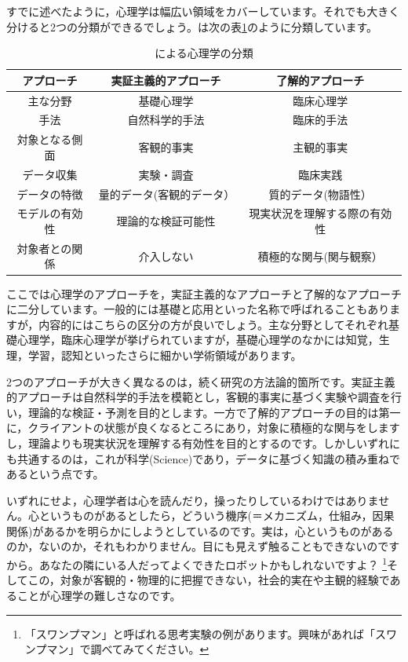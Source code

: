 \documentclass{ltjsbook}
\begin{document}
すでに述べたように，心理学は幅広い領域をカバーしています。それでも大きく分けると2つの分類ができるでしょう。\citet{Shimoyama2001}は次の表\ref{tbl01_01}のように分類しています。

\begin{table}[hb]
	\centering
	\caption{\citet{Shimoyama2001}による心理学の分類}
	\begin{tabular}{ccc}
		アプローチ   & 実証主義的アプローチ    & 了解的アプローチ       \\\hline
		主な分野    & 基礎心理学         & 臨床心理学          \\
		手法      & 自然科学的手法       & 臨床的手法          \\
		対象となる側面 & 客観的事実         & 主観的事実          \\
		データ収集   & 実験・調査         & 臨床実践           \\
		データの特徴  & 量的データ(客観的データ） & 質的データ(物語性）     \\
		モデルの有効性 & 理論的な検証可能性     & 現実状況を理解する際の有効性 \\
		対象者との関係 & 介入しない         & 積極的な関与(関与観察）   \\\hline
	\end{tabular}
	\label{tbl01_01}
\end{table}
ここでは心理学のアプローチを，実証主義的なアプローチと了解的なアプローチに二分しています。一般的には基礎と応用といった名称で呼ばれることもありますが，内容的にはこちらの区分の方が良いでしょう。主な分野としてそれぞれ基礎心理学，臨床心理学が挙げられていますが，基礎心理学のなかには知覚，生理，学習，認知といったさらに細かい学術領域があります。

2つのアプローチが大きく異なるのは，続く研究の方法論的箇所です。実証主義的アプローチは自然科学的手法を模範とし，客観的事実に基づく実験や調査を行い，理論的な検証・予測を目的とします。一方で了解的アプローチの目的は第一に，クライアントの状態が良くなるところにあり，対象に積極的な関与をしますし，理論よりも現実状況を理解する有効性を目的とするのです。しかしいずれにも共通するのは，これが科学(Science)であり，データに基づく知識の積み重ねであるという点です。

いずれにせよ，心理学者は心を読んだり，操ったりしているわけではありません。心というものがあるとしたら，どういう機序(＝メカニズム，仕組み，因果関係)があるかを明らかにしようとしているのです。実は，心というものがあるのか，ないのか，それもわかりません。目にも見えず触ることもできないのですから。あなたの隣にいる人だってよくできたロボットかもしれないですよ？ \footnote{「スワンプマン」と呼ばれる思考実験の例があります。興味があれば「スワンプマン」で調べてみてください。}そしてこの，対象が客観的・物理的に把握できない，社会的実在や主観的経験であることが心理学の難しさなのです。
\end{document}
